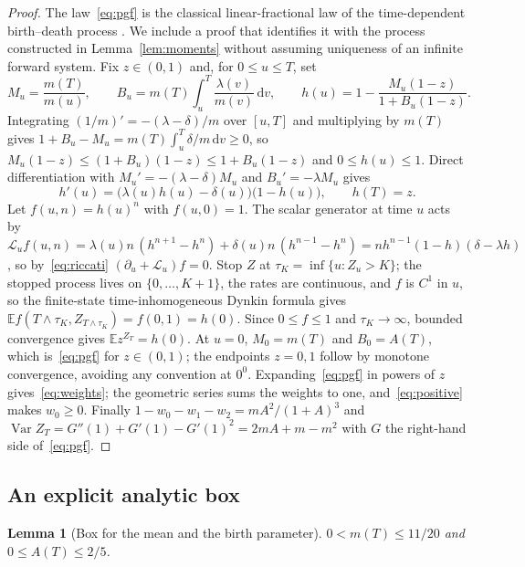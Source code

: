 \documentclass[11pt,a4paper]{article}
\theoremstyle{plain}
\newtheorem{lemma}[theorem]{Lemma}
\theoremstyle{definition}
\theoremstyle{remark}
\newcommand{\EE}{\mathbb E}
\newcommand{\Var}{\operatorname{Var}}
\newcommand{\cL}{\mathcal L}
\newcommand{\dd}{\mathrm d}
\begin{document}
\begin{proof}
The law~\eqref{eq:pgf} is the classical linear-fractional law of the time-dependent birth--death process \citep{kendall1948}. We include a proof that identifies it with the process constructed in Lemma~\ref{lem:moments} without assuming uniqueness of an infinite forward system. Fix $z\in(0,1)$ and, for $0\le u\le T$, set
\[
M_u=\frac{m(T)}{m(u)},\qquad B_u=m(T)\int_u^T\frac{\lambda(v)}{m(v)}\,\dd v,\qquad h(u)=1-\frac{M_u(1-z)}{1+B_u(1-z)} .
\]
Integrating $(1/m)'=-(\lambda-\delta)/m$ over $[u,T]$ and multiplying by $m(T)$ gives $1+B_u-M_u=m(T)\int_u^T\delta/m\,\dd v\ge0$, so $M_u(1-z)\le(1+B_u)(1-z)\le1+B_u(1-z)$ and $0\le h(u)\le1$. Direct differentiation with $M_u'=-(\lambda-\delta)M_u$ and $B_u'=-\lambda M_u$ gives
\begin{equation}\label{eq:riccati}
h'(u)=\bigl(\lambda(u)h(u)-\delta(u)\bigr)\bigl(1-h(u)\bigr),\qquad h(T)=z .
\end{equation}
Let $f(u,n)=h(u)^n$ with $f(u,0)=1$. The scalar generator at time $u$ acts by $\cL_uf(u,n)=\lambda(u)n\,(h^{n+1}-h^n)+\delta(u)n\,(h^{n-1}-h^n)=n h^{n-1}(1-h)(\delta-\lambda h)$, so by~\eqref{eq:riccati} $(\partial_u+\cL_u)f=0$. Stop $Z$ at $\tau_K=\inf\{u:Z_u>K\}$; the stopped process lives on $\{0,\dots,K+1\}$, the rates are continuous, and $f$ is $C^1$ in $u$, so the finite-state time-inhomogeneous Dynkin formula gives $\EE f(T\wedge\tau_K,Z_{T\wedge\tau_K})=f(0,1)=h(0)$. Since $0\le f\le1$ and $\tau_K\to\infty$, bounded convergence gives $\EE z^{Z_T}=h(0)$. At $u=0$, $M_0=m(T)$ and $B_0=A(T)$, which is~\eqref{eq:pgf} for $z\in(0,1)$; the endpoints $z=0,1$ follow by monotone convergence, avoiding any convention at $0^0$. Expanding~\eqref{eq:pgf} in powers of $z$ gives~\eqref{eq:weights}; the geometric series sums the weights to one, and~\eqref{eq:positive} makes $w_0\ge0$. Finally $1-w_0-w_1-w_2=mA^2/(1+A)^3$ and $\Var Z_T=G''(1)+G'(1)-G'(1)^2=2mA+m-m^2$ with $G$ the right-hand side of~\eqref{eq:pgf}.
\end{proof}

\subsection{An explicit analytic box}\label{sec:box}

\begin{lemma}[Box for the mean and the birth parameter]\label{lem:box}
$0<m(T)\le 11/20$ and $0\le A(T)\le 2/5$.
\end{lemma}
\end{document}
